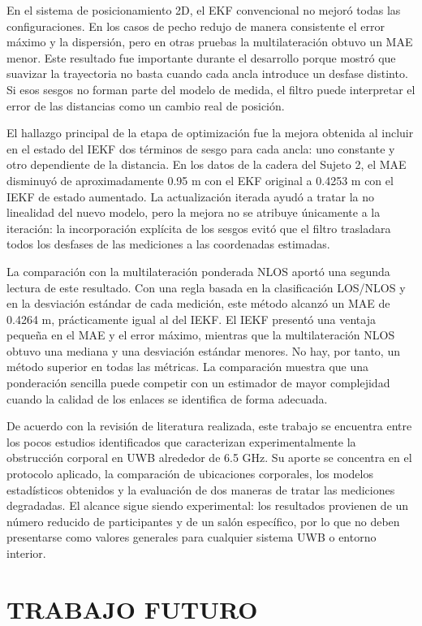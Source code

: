 En el sistema de posicionamiento 2D, el EKF convencional no mejoró todas las configuraciones. En los casos de pecho redujo de manera consistente el error máximo y la dispersión, pero en otras pruebas la multilateración obtuvo un MAE menor. Este resultado fue importante durante el desarrollo porque mostró que suavizar la trayectoria no basta cuando cada ancla introduce un desfase distinto. Si esos sesgos no forman parte del modelo de medida, el filtro puede interpretar el error de las distancias como un cambio real de posición.

El hallazgo principal de la etapa de optimización fue la mejora obtenida al incluir en el estado del IEKF dos términos de sesgo para cada ancla: uno constante y otro dependiente de la distancia. En los datos de la cadera del Sujeto 2, el MAE disminuyó de aproximadamente 0.95 m con el EKF original a 0.4253 m con el IEKF de estado aumentado. La actualización iterada ayudó a tratar la no linealidad del nuevo modelo, pero la mejora no se atribuye únicamente a la iteración: la incorporación explícita de los sesgos evitó que el filtro trasladara todos los desfases de las mediciones a las coordenadas estimadas.

La comparación con la multilateración ponderada NLOS aportó una segunda lectura de este resultado. Con una regla basada en la clasificación LOS/NLOS y en la desviación estándar de cada medición, este método alcanzó un MAE de 0.4264 m, prácticamente igual al del IEKF. El IEKF presentó una ventaja pequeña en el MAE y el error máximo, mientras que la multilateración NLOS obtuvo una mediana y una desviación estándar menores. No hay, por tanto, un método superior en todas las métricas. La comparación muestra que una ponderación sencilla puede competir con un estimador de mayor complejidad cuando la calidad de los enlaces se identifica de forma adecuada.

De acuerdo con la revisión de literatura realizada, este trabajo se encuentra entre los pocos estudios identificados que caracterizan experimentalmente la obstrucción corporal en UWB alrededor de 6.5 GHz. Su aporte se concentra en el protocolo aplicado, la comparación de ubicaciones corporales, los modelos estadísticos obtenidos y la evaluación de dos maneras de tratar las mediciones degradadas. El alcance sigue siendo experimental: los resultados provienen de un número reducido de participantes y de un salón específico, por lo que no deben presentarse como valores generales para cualquier sistema UWB o entorno interior.

\section{TRABAJO FUTURO}
\label{sec:trabajos_futuros}

